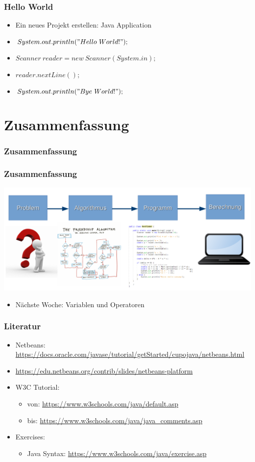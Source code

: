 \documentclass{beamer}
\begin{document}
	\begin{frame}
		\frametitle{Hello World}
		\begin{itemize}
			\item Ein neues Projekt erstellen: Java Application
			\item $System.out.println("Hello\ World!");$
			\pause
			\item $Scanner\ reader = new\ Scanner(System.in);$
			\item $reader.nextLine();$
			\pause
			\item $System.out.println("Bye\ World!");$
		\end{itemize}
	\end{frame}

	\section{Zusammenfassung}
	\begin{frame}
		\frametitle{Zusammenfassung}
	\end{frame}

	\begin{frame}
		\frametitle{Zusammenfassung}
		\includegraphics[width=\textwidth]{Alg-Prog-Schema}
		\begin{itemize}
			\item Nächste Woche: Variablen und Operatoren
		\end{itemize}
	\end{frame}

	\begin{frame}
		\frametitle{Literatur}
		\begin{itemize}
			\item Netbeans: \url{https://docs.oracle.com/javase/tutorial/getStarted/cupojava/netbeans.html}
			\item \url{https://edu.netbeans.org/contrib/slides/netbeans-platform}
			\item W3C Tutorial: 
			\begin{itemize}
				\item von: \url{https://www.w3schools.com/java/default.asp}
				\item bis: \url{https://www.w3schools.com/java/java\_comments.asp}
			\end{itemize}
			\item Exercises:
			\begin{itemize}
				\item Java Syntax: \url{https://www.w3schools.com/java/exercise.asp}
			\end{itemize}
		\end{itemize}
	\end{frame}
\end{document}
